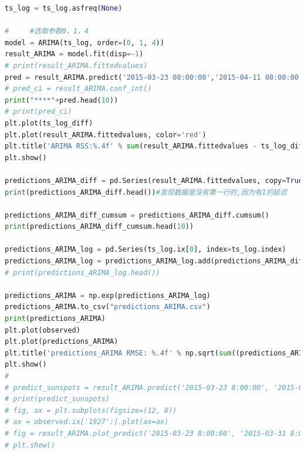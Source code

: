 \documentclass{whutmod}
\begin{document}
\begin{lstlisting}[language=python]
ts_log = ts_log.asfreq(None)

#     #选取参数0，1，4
model = ARIMA(ts_log, order=(0, 1, 4))
result_ARIMA = model.fit(disp=-1)
# print(result_ARIMA.fittedvalues)
pred = result_ARIMA.predict('2015-03-23 08:00:00','2015-04-11 08:00:00',dynamic=True)
# pred_ci = result_ARIMA.conf_int()
print("****"+pred.head(10))
# print(pred_ci)
plt.plot(ts_log_diff)
plt.plot(result_ARIMA.fittedvalues, color='red')
plt.title('ARIMA RSS:%.4f' % sum(result_ARIMA.fittedvalues - ts_log_diff) ** 2)
plt.show()

predictions_ARIMA_diff = pd.Series(result_ARIMA.fittedvalues, copy=True)
print(predictions_ARIMA_diff.head())#发现数据是没有第一行的,因为有1的延迟

predictions_ARIMA_diff_cumsum = predictions_ARIMA_diff.cumsum()
print(predictions_ARIMA_diff_cumsum.head(10))

predictions_ARIMA_log = pd.Series(ts_log.ix[0], index=ts_log.index)
predictions_ARIMA_log = predictions_ARIMA_log.add(predictions_ARIMA_diff_cumsum, fill_value=0)
# print(predictions_ARIMA_log.head())

predictions_ARIMA = np.exp(predictions_ARIMA_log)
predictions_ARIMA.to_csv("predictions_ARIMA.csv")
print(predictions_ARIMA)
plt.plot(observed)
plt.plot(predictions_ARIMA)
plt.title('predictions_ARIMA RMSE: %.4f' % np.sqrt(sum((predictions_ARIMA - observed['data']) ** 2) / len(observed['data'])))
plt.show()
#
# predict_sunspots = result_ARIMA.predict('2015-03-23 8:00:00', '2015-03-31 8:00:00', dynamic=True)
# print(predict_sunspots)
# fig, ax = plt.subplots(figsize=(12, 8))
# ax = observed.ix['1927':].plot(ax=ax)
# fig = result_ARIMA.plot_predict('2015-03-23 8:00:00', '2015-03-31 8:00:00', dynamic=True, ax=ax, plot_insample=False)
# plt.show()


\end{lstlisting}
\end{document}
